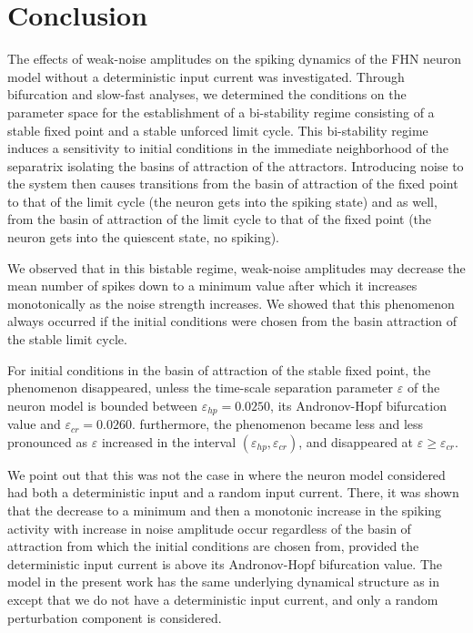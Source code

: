 \section{Conclusion}\label{sect6}
\noindent
The effects of weak-noise amplitudes on the spiking dynamics of the FHN
neuron model without a deterministic input current was
investigated. Through bifurcation and slow-fast analyses, we
determined the conditions on the parameter space for the
establishment of a bi-stability regime consisting of a stable fixed
point and a stable unforced limit cycle. This bi-stability regime
induces a sensitivity to initial conditions in the
immediate neighborhood of the separatrix isolating the basins of attraction of the 
attractors. Introducing noise to the system then causes
transitions from the basin of attraction of the fixed point to that of
the limit cycle (the neuron gets into the spiking state) and as well, from the
basin of attraction of the limit cycle to that of the fixed point
(the neuron gets into the quiescent state, no spiking). 

We observed that in this bistable regime, weak-noise amplitudes
may decrease the mean number of spikes down to a minimum value
after which it increases monotonically as the noise strength increases. 
We showed that this phenomenon always occurred if the initial
conditions were chosen from the basin attraction of the stable
limit cycle. 

For initial conditions in the basin of attraction of
the stable fixed point, the phenomenon disappeared, unless  the time-scale separation parameter 
$\varepsilon$ of the neuron model
is bounded  between $\varepsilon_{hp}=0.0250$, 
its Andronov-Hopf bifurcation
value and $\varepsilon_{cr}=0.0260$. 
furthermore, the 
phenomenon became less and less pronounced
as $\varepsilon$ increased in the interval 
$(\varepsilon_{hp},\varepsilon_{cr})$, and
disappeared at $\varepsilon\geq\varepsilon_{cr}$.

We point out that this was not the case in \cite{Gutkin2} where
the neuron model considered had both a deterministic input and a
random input current. There, it was shown  that the decrease
to a minimum and then a monotonic increase in the spiking activity with
increase in noise amplitude occur regardless of the basin of
attraction from which the initial conditions are chosen 
from, provided the deterministic input current is above its
Andronov-Hopf bifurcation value. The model in the present work has
the same underlying dynamical structure as in \cite{Gutkin2}
except that we do not have a deterministic input current, and only  a
random perturbation component is considered.

